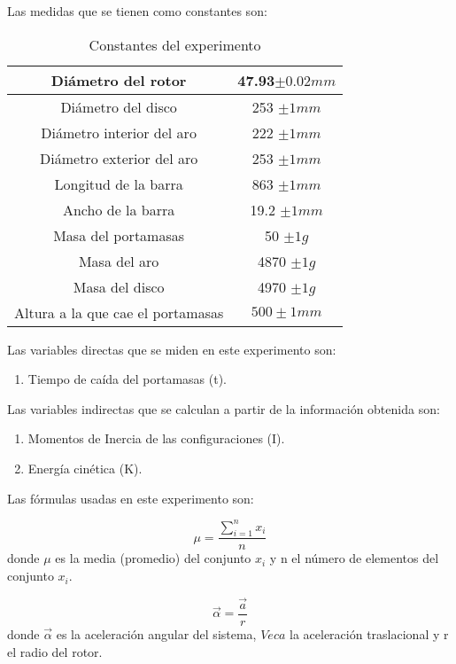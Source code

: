 \documentclass[a4paper]{article}
\begin{document}
Las medidas que se tienen como constantes son: 
\begin{table}[H]
\centering 
\begin{tabular}{|c|c|}
    \hline
        Diámetro del rotor & 47.93$ \pm 0.02 mm$ \\ \hline
        Diámetro del disco & 253 $ \pm 1 mm$ \\ \hline
        Diámetro interior del aro & 222 $ \pm 1 mm$ \\ \hline
        Diámetro exterior del aro & 253 $ \pm 1 mm$ \\ \hline
        Longitud de la barra  & 863 $ \pm 1 mm$ \\ \hline
        Ancho de la barra & 19.2 $ \pm 1 mm$ \\ \hline
        Masa del portamasas & 50 $ \pm 1 g$ \\ \hline
        Masa del aro & 4870 $ \pm 1 g$\\ \hline
        Masa del disco & 4970 $ \pm 1 g$ \\ \hline
        Altura a la que cae el portamasas & $500 \pm 1 mm$ \\ \hline
        
\end{tabular}
 \caption{Constantes del experimento}
\end{table}

Las variables directas que se miden en este experimento son:
\begin{enumerate}
  \item Tiempo de caída del portamasas (t).
\end{enumerate}

Las variables indirectas que se calculan a partir de la información obtenida son:
\begin{enumerate}
  \item Momentos de Inercia de las configuraciones (I).
  \item Energía cinética (K).
\end{enumerate}

Las fórmulas usadas en este experimento son:

\begin{equation}
    \mu= \frac{\displaystyle\sum_{i=1}^{n} x_i}{n}
\end{equation}
donde $\mu$ es la media (promedio) del conjunto $x_i$ y n el número de elementos del conjunto $x_i$.
  
\begin{equation}
    \Vec{\alpha}=\frac{\Vec{a}}{r }
\end{equation}
donde $\Vec{\alpha}$ es la aceleración angular del sistema, $Vec{a}$ la aceleración traslacional y r el radio del rotor. 
\end{document}
